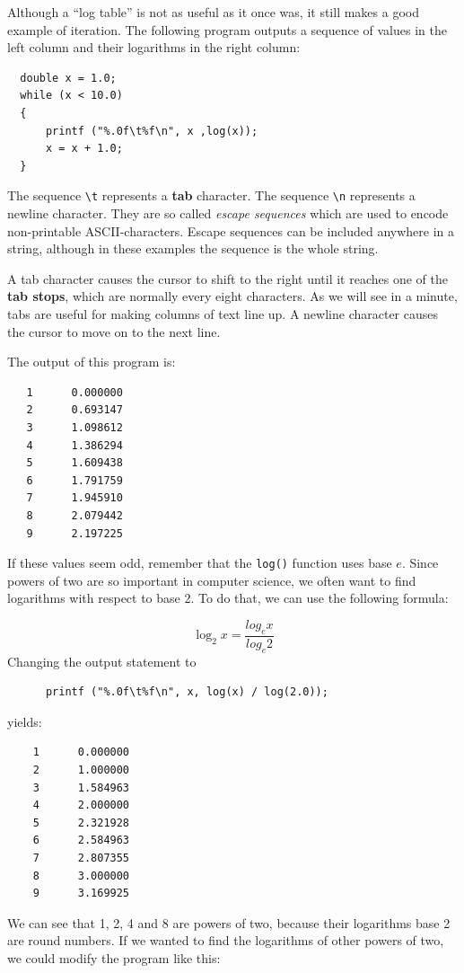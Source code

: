Although a ``log table'' is not as useful as it once was, it still
makes a good example of iteration.  The following program outputs a
sequence of values in the left column and their logarithms in the
right column:

\begin{verbatim}
  double x = 1.0;
  while (x < 10.0) 
  {
      printf ("%.0f\t%f\n", x ,log(x));
      x = x + 1.0;
  }
\end{verbatim}
%
The sequence \verb+\t+ represents a {\bf tab} character.
The sequence \verb+\n+ represents a newline character.  
They are so called \emph{escape sequences} which are used to encode
non-printable ASCII-characters.
Escape sequences can be included anywhere in a string, although in these examples
the sequence is the whole string.

A tab character causes the cursor to shift to the right until
it reaches one of the {\bf tab stops}, which are normally every
eight characters.  As we will see in a minute, tabs are useful
for making columns of text line up.
A newline character causes the cursor to move on to the next line.  

The output of this program is:

\begin{verbatim}
   1      0.000000
   2      0.693147
   3      1.098612
   4      1.386294
   5      1.609438
   6      1.791759
   7      1.945910
   8      2.079442
   9      2.197225
\end{verbatim}
%
If these values seem odd, remember that the {\tt log()} function uses
base $e$.  Since powers of two are so important in computer science,
we often want to find logarithms with respect to base 2.  To do that,
we can use the following formula:

\[ \log_2 x = \frac {log_e x}{log_e 2} \]
%
Changing the output statement to

\begin{verbatim}
      printf ("%.0f\t%f\n", x, log(x) / log(2.0));
\end{verbatim}
%
yields:

\begin{verbatim}
    1      0.000000
    2      1.000000
    3      1.584963
    4      2.000000
    5      2.321928
    6      2.584963
    7      2.807355
    8      3.000000
    9      3.169925
\end{verbatim}
%
We can see that 1, 2, 4 and 8 are powers of two, because
their logarithms base 2 are round numbers.  If we wanted to find
the logarithms of other powers of two, we could modify the
program like this:

